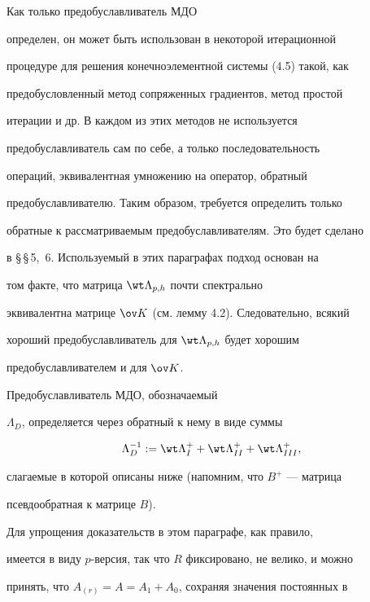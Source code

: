 Как только предобуславливатель МДО 


определен, он может быть использован в некоторой итерационной


процедуре для решения конечноэлементной системы (4.5) такой, как 


предобусловленный метод сопряженных градиентов, метод простой 


итерации и др. В каждом из этих методов не используется 


предобуславливатель сам по себе, а только последовательность 


операций, эквивалентная умножению на оператор, обратный 


предобуславливателю. Таким образом, требуется определить только 


обратные к рассматриваемым предобуславливателям. Это будет сделано 


в \S\,\S\,5,~6. Используемый в этих параграфах подход основан на


том факте, что матрица $\wt \Lambda_{p,h}$ почти спектрально 


эквивалентна матрице $\ov K$ (см. лемму 4.2). Следовательно, всякий 


хороший предобуславливатель для $\wt \Lambda_{p,h}$ будет хорошим 


предобуславливателем и для $\ov K$.





Предобуславливатель МДО, обозначаемый 


$\Lambda_D$, определяется через обратный к нему в виде суммы 


\begin{equation}


\Lambda^{-1}_D:=\wt \Lambda^{+}_I+\wt \Lambda^+_{II}+


\wt \Lambda^+_{III},


\label{5.7}


\end{equation}


слагаемые в которой описаны ниже (напомним, что $B^+$ --- матрица 


псевдообратная к матрице $B$).


Для упрощения доказательств в этом параграфе, как правило, 


имеется в виду $p$-версия, так что $R$ фиксировано, не велико, и можно 


принять, что $A_{(r)}= A=A_1+A_0$, сохраняя значения постоянных в 


